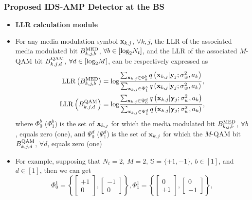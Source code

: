 \documentclass[9pt]{beamer}
\begin{document}
\begin{frame}
\frametitle{Proposed IDS-AMP Detector at the BS}
\begin{itemize}
\item
{\bf LLR calculation module}
\item
For any media modulation symbol ${\bf x}_{k,j}$, $\forall k,j$, the LLR of the associated media modulated bit $B_{k,j,b}^{\rm MED}$, $\forall b\in[{\rm log}_2N_t]$, and the LLR of the associated $M$-QAM bit $B_{k,j,d}^{\rm QAM}$, $\forall d\in[{\rm log}_2M]$, can be respectively expressed as
\begin{align}
\label{eq:LLR1}{\rm LLR}\left({B_{k,j,b}^{\rm MED}}\right)&={\rm log}\dfrac {\sum\nolimits_{{\bf x}_{k,j}\in\Phi_0^{b}} q\left({{\bf x}_{k,j}|{\bf y}_j;\sigma_w^2,a_k}\right)}{\sum\nolimits_{{\bf x}_{k,j}\in\Phi_1^{b}}q\left({{\bf x}_{k,j}|{\bf y}_j;\sigma_w^2,a_k}\right)},\\
\label{eq:LLR2}{\rm LLR}\left({B_{k,j,d}^{\rm QAM}}\right)&={\rm log}\dfrac {\sum\nolimits_{{\bf x}_{k,j}\in\Psi_0^{d}} q\left({{\bf x}_{k,j}|{\bf y}_j;\sigma_w^2,a_k}\right)}{\sum\nolimits_{{\bf x}_{k,j}\in\Psi_1^{d}}q\left({{\bf x}_{k,j}|{\bf y}_j;\sigma_w^2,a_k}\right)},
\end{align}
where $\Phi_0^b$ ($\Phi_1^b$) is the set of ${\bf x}_{k,j}$ for which the media modulated bit $B_{k,j,b}^{\rm MED}$, $\forall b$, equals zero (one), and $\Psi_0^d$ ($\Psi_1^d$) is the set of ${\bf x}_{k,j}$ for which the $M$-QAM bit $B_{k,j,d}^{\rm QAM}$, $\forall d$, equals zero (one)
\item
For example, supposing that $N_t=2$, $M=2$, $\mathbb{S}=\{+1,-1\}$, $b\in[1]$, and $d\in[1]$, then we can get
\begin{equation}\label{eq:examplePhi}
\Phi_0^1 = {\left\{ {\left[ {\begin{array}{*{10}{c}}
+1\\
0
\end{array}} \right],\left[ {\begin{array}{*{10}{c}}
-1\\
0
\end{array}} \right]} \right\}},
\Phi_1^1 = {\left\{ {\left[ {\begin{array}{*{10}{c}}
0\\
+1
\end{array}} \right],\left[ {\begin{array}{*{10}{c}}
0\\
-1
\end{array}} \right]} \right\}},
\end{equation}


\end{itemize}
\end{frame}
\end{document}
